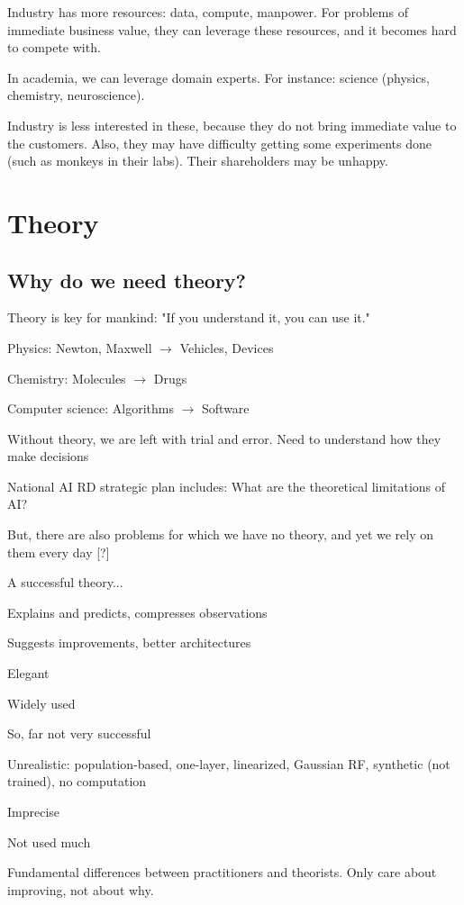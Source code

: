 \documentclass[english]{article}
\begin{document}
\benum 
\item Industry has more resources: data, compute, manpower. For problems of immediate business value, they can leverage these resources, and it becomes hard to compete with.
\item In academia, we can leverage domain experts. For instance: science (physics, chemistry, neuroscience). 

Industry is less interested in these, because they do not bring immediate value to the customers. Also, they may have difficulty getting some experiments done (such as monkeys in their labs). Their shareholders may be unhappy.

\eenum


\section{Theory}
%
\subsection{Why do we need theory?}
%
\bitem
\item Theory is key for mankind: "If you understand it, you can use it."
\bitem
\item Physics: Newton, Maxwell $\to$ Vehicles, Devices
\item Chemistry: Molecules $\to$ Drugs
\item Computer science: Algorithms $\to$ Software
\eitem
\item Without theory, we are left with trial and error. Need to understand how they make decisions


\item National AI RD strategic plan includes: What are the theoretical limitations of AI? 
\item But, there are also problems for which we have no theory, and yet we rely on them every day [?]
\item A successful theory...
\bitem
\item Explains and predicts, compresses observations
\item Suggests improvements, better architectures
\item Elegant
\item Widely used %

\eitem

\item So, far not very successful
\bitem
\item Unrealistic: population-based, one-layer, linearized, Gaussian RF, synthetic (not trained), no computation
\item Imprecise
\item Not used much
\eitem
\item  Fundamental differences between practitioners and theorists. Only care about improving, not about why. 
\end{document}
